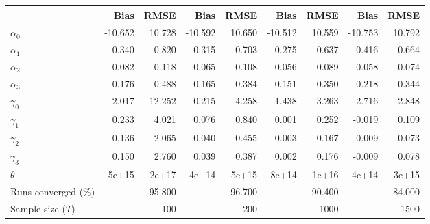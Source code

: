 
\begin{tabular}[t]{lrrrrrrrr}
\toprule
  & Bias & RMSE & Bias & RMSE & Bias & RMSE & Bias & RMSE\\
\midrule
$\alpha_{0}$ & -10.652 & 10.728 & -10.592 & 10.650 & -10.512 & 10.559 & -10.753 & 10.792\\
$\alpha_{1}$ & -0.340 & 0.820 & -0.315 & 0.703 & -0.275 & 0.637 & -0.416 & 0.664\\
$\alpha_{2}$ & -0.082 & 0.118 & -0.065 & 0.108 & -0.056 & 0.089 & -0.058 & 0.074\\
$\alpha_{3}$ & -0.176 & 0.488 & -0.165 & 0.384 & -0.151 & 0.350 & -0.218 & 0.344\\
$\gamma_{0}$ & -2.017 & 12.252 & 0.215 & 4.258 & 1.438 & 3.263 & 2.716 & 2.848\\
$\gamma_{1}$ & 0.233 & 4.021 & 0.076 & 0.840 & 0.001 & 0.252 & -0.019 & 0.109\\
$\gamma_{2}$ & 0.136 & 2.065 & 0.040 & 0.455 & 0.003 & 0.167 & -0.009 & 0.073\\
$\gamma_{3}$ & 0.150 & 2.760 & 0.039 & 0.387 & 0.002 & 0.176 & -0.009 & 0.078\\
$\theta$ & -5e+15 & 2e+17 & 4e+14 & 5e+15 & 8e+14 & 1e+16 & 4e+14 & 3e+15\\
Runs converged (\%) &  & 95.800 &  & 96.700 &  & 90.400 &  & 84.000\\
Sample size ($T$) &  & 100 &  & 200 &  & 1000 &  & 1500\\
\bottomrule
\end{tabular}

